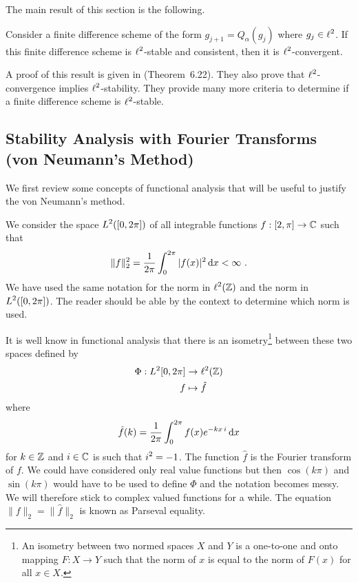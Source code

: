 The main result of this section is the following.

\begin{theorem} \label{ell2StabConstConv}
Consider a finite difference scheme of the form $g_{j+1} = Q_\alpha(g_j)$
where $\displaystyle g_j \in \ell^2$.   If this finite difference scheme is
$\displaystyle \ell^2$-stable and consistent, then it is
$\displaystyle \ell^2$-convergent. 
\end{theorem}

A proof of this result is given in \cite{WH} (Theorem~6.22).  They
also prove that $\displaystyle \ell^2$-convergence implies
$\displaystyle \ell^2$-stability.  They
provide many more criteria to determine if a finite difference scheme is
$\displaystyle \ell^2$-stable.

\subsection[von Neumann's Method]{Stability Analysis with Fourier
Transforms (von Neumann's Method)} \label{vonNewmannMeth}

We first review some concepts of functional analysis that will be
useful to justify the von Neumann's method.

We consider the space $\displaystyle L^2([0,2\pi])$ of all integrable
functions $f:[2,\pi] \to \mathbb{C}$ such that
\[
  \|f\|_2^2 = \frac{1}{2\pi} \int_0^{2\pi} |f(x)|^2 \,\mathrm{d}x < \infty \ .
\]
We have used the same notation for the norm in
$\displaystyle \ell^2(\mathbb{Z})$ and the norm
in $\displaystyle L^2([0,2\pi])$.  The reader should be able by the context to
determine which norm is used. 

It is well know in functional analysis that there is an
isometry\footnote{An isometry between two normed spaces $X$ and $Y$
is a one-to-one and onto mapping $F:X \to Y$ such that the norm of $x$
is equal to the norm of $F(x)$ for all $x \in X$.}
between these two spaces defined by
\begin{align*}
\Phi : L^2{[0,2\pi]} & \to \ell^2(\mathbb{Z}) \\
f & \mapsto \hat{f}
\end{align*}
where
\[
  \hat{f}(k) = \frac{1}{2\pi} \int_0^{2\pi} f(x) e^{-k x\,i} \,\mathrm{d}x
\]
for $k\in \mathbb{Z}$ and $i \in \mathbb{C}$ is such that $\displaystyle i^2 =-1$.
The function $\hat{f}$ is the Fourier transform of $f$.  We could have
considered only real value functions but then $\cos(k \pi)$ and
$\sin(k \pi)$ would have to be used to define $\Phi$ and the notation
becomes messy.  We will therefore stick to complex valued functions
for a while.  The equation $\|f\|_2 = \|\hat{f}\|_2$ is known as
Parseval equality.

